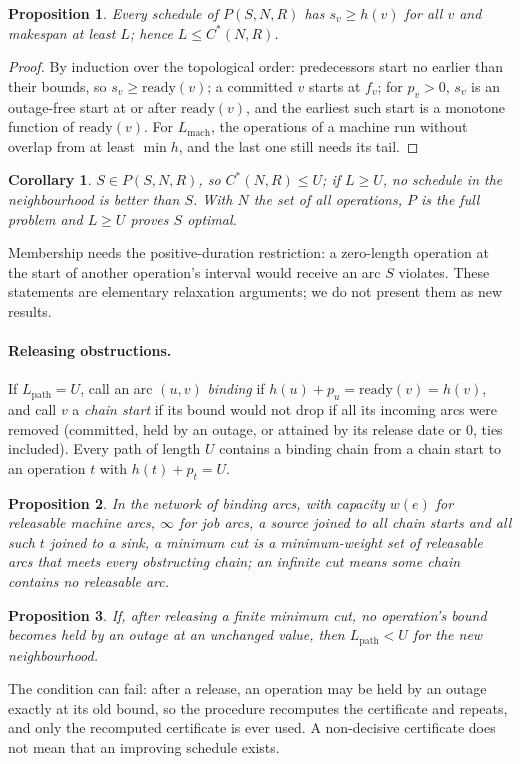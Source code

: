 \documentclass[letterpaper]{article} %
\newtheorem{proposition}{Proposition}
\newtheorem{corollary}{Corollary}
\begin{document}
\begin{proposition}
Every schedule of $P(S,N,R)$ has $s_v\ge h(v)$ for all $v$ and makespan at least $L$; hence $L \le C^*(N,R)$.
\end{proposition}
\begin{proof}
By induction over the topological order: predecessors start no earlier than their bounds, so $s_v \ge \mathrm{ready}(v)$; a committed $v$ starts at $f_v$; for $p_v>0$, $s_v$ is an outage-free start at or after $\mathrm{ready}(v)$, and the earliest such start is a monotone function of $\mathrm{ready}(v)$. For $L_{\mathrm{mach}}$, the operations of a machine run without overlap from at least $\min h$, and the last one still needs its tail.
\end{proof}

\begin{corollary}
$S\in P(S,N,R)$, so $C^*(N,R)\le U$; if $L\ge U$, no schedule in the neighbourhood is better than $S$. With $N$ the set of all operations, $P$ is the full problem and $L\ge U$ proves $S$ optimal.
\end{corollary}
Membership needs the positive-duration restriction: a zero-length operation at the start of another operation's interval would receive an arc $S$ violates. These statements are elementary relaxation arguments; we do not present them as new results.

\paragraph{Releasing obstructions.} If $L_{\mathrm{path}}=U$, call an arc $(u,v)$ \emph{binding} if $h(u)+p_u=\mathrm{ready}(v)=h(v)$, and call $v$ a \emph{chain start} if its bound would not drop if all its incoming arcs were removed (committed, held by an outage, or attained by its release date or 0, ties included). Every path of length $U$ contains a binding chain from a chain start to an operation $t$ with $h(t)+p_t=U$.
\begin{proposition}
In the network of binding arcs, with capacity $w(e)$ for releasable machine arcs, $\infty$ for job arcs, a source joined to all chain starts and all such $t$ joined to a sink, a minimum cut is a minimum-weight set of releasable arcs that meets every obstructing chain; an infinite cut means some chain contains no releasable arc.
\end{proposition}
\begin{proposition}
If, after releasing a finite minimum cut, no operation's bound becomes held by an outage at an unchanged value, then $L_{\mathrm{path}}<U$ for the new neighbourhood.
\end{proposition}
The condition can fail: after a release, an operation may be held by an outage exactly at its old bound, so the procedure recomputes the certificate and repeats, and only the recomputed certificate is ever used. A non-decisive certificate does not mean that an improving schedule exists.
\end{document}
